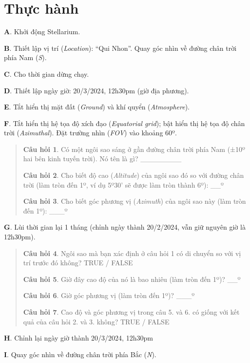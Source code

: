 \documentclass[
]{book}
\begin{document}
\section{Thực hành}\label{thux1ef1c-huxe0nh}

\textbf{A}. Khởi động Stellarium.

\textbf{B}. Thiết lập vị trí (\emph{Location}): ``Qui Nhon''. Quay góc nhìn về đường chân trời phía Nam (\emph{S}).

\textbf{C}. Cho thời gian dừng chạy.

\textbf{D}. Thiết lập ngày giờ: 20/3/2024, 12h30pm (giờ địa phương).

\textbf{E}. Tắt hiển thị mặt đất (\emph{Ground}) và khí quyển (\emph{Atmosphere}).

\textbf{F}. Tắt hiển thị hệ tọa độ xích đạo (\emph{Equatorial grid}); bật hiển thị hệ tọa độ chân trời (\emph{Azimuthal}). Đặt trường nhìn (\emph{FOV}) vào khoảng 60º.

\begin{quote}
\textbf{Câu hỏi 1}. Có một ngôi sao sáng ở gần đường chân trời phía Nam (±10º hai bên kinh tuyến trời). Nó tên là gì?
\_\_\_\_\_\_\_\_

\textbf{Câu hỏi 2}. Cho biết độ cao (\emph{Altitude}) của ngôi sao đó so với đường chân trời (làm tròn đến 1º, ví dụ 5º30' sẽ được làm tròn thành 6º):
\_\_º

\textbf{Câu hỏi 3}. Cho biết góc phương vị (\emph{Azimuth}) của ngôi sao này (làm tròn đến 1º):
\_\_\_º
\end{quote}

\textbf{G}. Lùi thời gian lại 1 tháng (chỉnh ngày thành 20/2/2024, vẫn giữ nguyên giờ là 12h30pm).

\begin{quote}
\textbf{Câu hỏi 4}. Ngôi sao mà bạn xác định ở câu hỏi 1 có di chuyển so với vị trí trước đó không?
TRUE / FALSE

\textbf{Câu hỏi 5}. Giờ đây cao độ của nó là bao nhiêu (làm tròn đến 1º)?
\_\_º

\textbf{Câu hỏi 6}. Giờ góc phương vị (làm tròn đến 1º)?
\_\_\_º

\textbf{Câu hỏi 7}. Cao độ và góc phương vị trong câu 5. và 6. có giống với kết quả của câu hỏi 2. và 3. không?
TRUE / FALSE
\end{quote}

\textbf{H}. Chỉnh lại ngày giờ thành 20/3/2024, 12h30pm

\textbf{I}. Quay góc nhìn về đường chân trời phía Bắc (\emph{N}).
\end{document}
